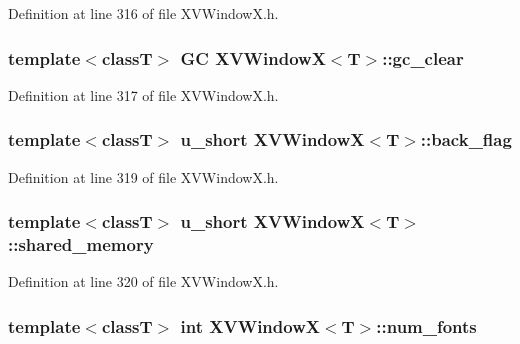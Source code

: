 Definition at line 316 of file XVWindow\-X.h.\label{XVWindowX_n15}
\hypertarget{class_XVWindowX_n15}{
\subsubsection[gc_clear]{\setlength{\rightskip}{0pt plus 5cm}template$<$classT$>$ GC XVWindow\-X$<$T$>$::gc\_\-clear}}




Definition at line 317 of file XVWindow\-X.h.\label{XVWindowX_n16}
\hypertarget{class_XVWindowX_n16}{
\subsubsection[back_flag]{\setlength{\rightskip}{0pt plus 5cm}template$<$classT$>$ u\_\-short XVWindow\-X$<$T$>$::back\_\-flag}}




Definition at line 319 of file XVWindow\-X.h.\label{XVWindowX_n17}
\hypertarget{class_XVWindowX_n17}{
\subsubsection[shared_memory]{\setlength{\rightskip}{0pt plus 5cm}template$<$classT$>$ u\_\-short XVWindow\-X$<$T$>$::shared\_\-memory}}




Definition at line 320 of file XVWindow\-X.h.\label{XVWindowX_n18}
\hypertarget{class_XVWindowX_n18}{
\subsubsection[num_fonts]{\setlength{\rightskip}{0pt plus 5cm}template$<$classT$>$ int XVWindow\-X$<$T$>$::num\_\-fonts}}




